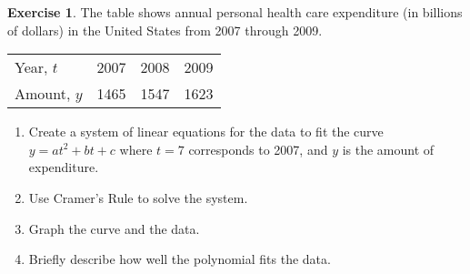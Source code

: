 \documentclass{beamer}
\newcommand{\fn}{\insertframenumber}
\theoremstyle{definition}
\newtheorem{exercise}{Exercise}
\begin{document}
\begin{frame}{\fn}
	\begin{exercise}
		The table shows annual personal health care expenditure (in billions of dollars) in the United States from 2007 through 2009.  
	
		\begin{center}
			\begin{tabular}{l|ccc}
				\hline
				Year, $t$ &2007&2008&2009\\
				Amount, $y$ & 1465&1547&1623\\
				\hline
			\end{tabular}
		\end{center}
	\begin{enumerate}[label=(\alph*)]
		\item Create a system of linear equations for the data to fit the curve $y=at^2+bt+c$ where $t=7$ corresponds to 2007, and $y$ is the amount of expenditure.
		\item Use Cramer's Rule to solve the system.
		\item Graph the curve and the data.
		\item Briefly describe how well the polynomial fits the data.
	\end{enumerate}
	\end{exercise}
\end{frame}
\end{document}
